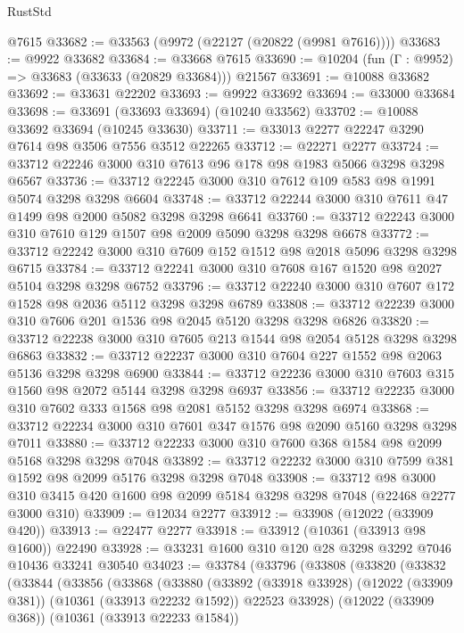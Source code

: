 \begin{lexlean}{RustStd}
\begin{coremodule}
    @7615
@33682 := @33563 (@9972 (@22127 (@20822 (@9981 @7616))))
@33683 := @9922 @33682
@33684 := @33668 @7615
@33690 := @10204 (fun (Γ : @9952) => @33683 (@33633 (@20829 @33684))) @21567
@33691 := @10088 @33682
@33692 := @33631 @22202
@33693 := @9922 @33692
@33694 := @33000 @33684
@33698 := @33691 (@33693 @33694) (@10240 @33562)
@33702 := @10088 @33692 @33694 (@10245 @33630)
@33711 := @33013 @2277 @22247 @3290 @7614 @98 @3506 @7556 @3512 @22265
@33712 := @22271 @2277
@33724 := @33712 @22246 @3000 @310 @7613 @96 @178 @98 @1983 @5066 @3298 @3298 @6567
@33736 := @33712 @22245 @3000 @310 @7612 @109 @583 @98 @1991 @5074 @3298 @3298 @6604
@33748 := @33712 @22244 @3000 @310 @7611 @47 @1499 @98 @2000 @5082 @3298 @3298 @6641
@33760 := @33712 @22243 @3000 @310 @7610 @129 @1507 @98 @2009 @5090 @3298 @3298 @6678
@33772 := @33712 @22242 @3000 @310 @7609 @152 @1512 @98 @2018 @5096 @3298 @3298 @6715
@33784 := @33712 @22241 @3000 @310 @7608 @167 @1520 @98 @2027 @5104 @3298 @3298 @6752
@33796 := @33712 @22240 @3000 @310 @7607 @172 @1528 @98 @2036 @5112 @3298 @3298 @6789
@33808 := @33712 @22239 @3000 @310 @7606 @201 @1536 @98 @2045 @5120 @3298 @3298 @6826
@33820 := @33712 @22238 @3000 @310 @7605 @213 @1544 @98 @2054 @5128 @3298 @3298 @6863
@33832 := @33712 @22237 @3000 @310 @7604 @227 @1552 @98 @2063 @5136 @3298 @3298 @6900
@33844 := @33712 @22236 @3000 @310 @7603 @315 @1560 @98 @2072 @5144 @3298 @3298 @6937
@33856 := @33712 @22235 @3000 @310 @7602 @333 @1568 @98 @2081 @5152 @3298 @3298 @6974
@33868 := @33712 @22234 @3000 @310 @7601 @347 @1576 @98 @2090 @5160 @3298 @3298 @7011
@33880 := @33712 @22233 @3000 @310 @7600 @368 @1584 @98 @2099 @5168 @3298 @3298 @7048
@33892 := @33712 @22232 @3000 @310 @7599 @381 @1592 @98 @2099 @5176 @3298 @3298 @7048
@33908 := @33712
    @98
    @3000
    @310
    @3415
    @420
    @1600
    @98
    @2099
    @5184
    @3298
    @3298
    @7048
    (@22468 @2277 @3000 @310)
@33909 := @12034 @2277
@33912 := @33908 (@12022 (@33909 @420))
@33913 := @22477 @2277
@33918 := @33912 (@10361 (@33913 @98 @1600)) @22490
@33928 := @33231 @1600 @310 @120 @28 @3298 @3292 @7046 @10436 @33241 @30540
@34023 := @33784
    (@33796
      (@33808
        (@33820
          (@33832
            (@33844
              (@33856
                (@33868
                  (@33880
                    (@33892
                      (@33918 @33928)
                      (@12022 (@33909 @381))
                      (@10361 (@33913 @22232 @1592))
                      @22523
                      @33928)
                    (@12022 (@33909 @368))
                    (@10361 (@33913 @22233 @1584))

\end{coremodule}
\end{lexlean}
